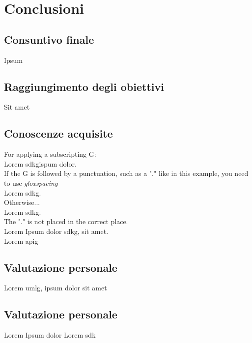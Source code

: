 \chapter{Conclusioni}
\label{chap:conclusioni}

\section{Consuntivo finale}
Ipsum

\section{Raggiungimento degli obiettivi}
Sit amet

\section{Conoscenze acquisite}

For applying a subscripting G:\\
Lorem \gls{sdkg}\glox ispum dolor.\\
If the G is followed by a punctuation, such as a "." like in this example, you need to use \textit{gloxspacing}\\
Lorem \gls{sdkg}\glox\gloxspacing.\\
Otherwise...\\
Lorem \gls{sdkg}\glox.\\
The "." is not placed in the correct place.\\
Lorem Ipsum dolor \gls{sdkg}\glox\gloxspacing, sit amet.\\
Lorem \gls{apig}

\section{Valutazione personale}
Lorem \gls{umlg}\glox\gloxspacing, ipsum dolor sit amet

\section{Valutazione personale}
Lorem Ipsum dolor Lorem \gls{sdk}

\newpage